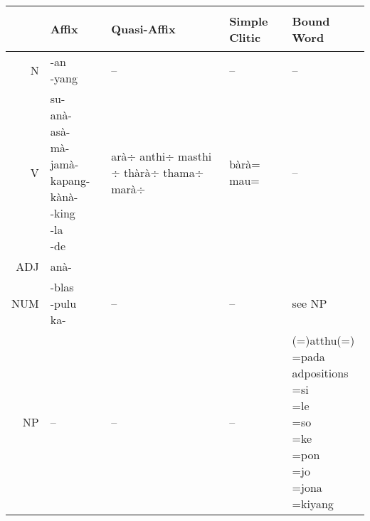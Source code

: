 \begin{table}
	\centering
		\begin{tabular}{r|llll}
& \parbox{2cm}{\begin{center}Affix       \end{center}} & Quasi-Affix & Simple Clitic & Bound Word\\						\hline
   N & \parbox{2cm}{\vspace{.2cm}-an\\-yang} &  --   & --  &  --   \vspace{.2cm} \\
						\hline
 V & \parbox{2cm}{\vspace{.2cm}su-\\anà-\\asà-\\mà-\\jamà-\\kapang-}\parbox{2cm}{kànà-\\-king\\-la\\-de}
 &\parbox{2cm}{\vspace{.2cm}arà$\div$\\anthi$\div$\\masthi$\div$\\thàrà$\div$\\thama$\div$\\marà$\div$}&\parbox{2cm}{bàrà=\\mau=} & -- \vspace{.2cm}\\
\hline
ADJ & anà- & &\vspace{.2cm} \\
\hline
NUM &	\parbox{2cm}{\vspace{.2cm}-blas\\-pulu\\ka-}&  -- & --  &  see NP\vspace{.2cm}\\
\hline
NP &  --   &    --    &  -- & \parbox{2cm}{\vspace{.2cm}(=)atthu(=)\\=pada\\ adpositions\\=si\\=le\\=so\\=ke\\=pon\\=jo\\=jona\\=kiyang\vspace{.2cm}}\\

\end{tabular}
\end{table}
